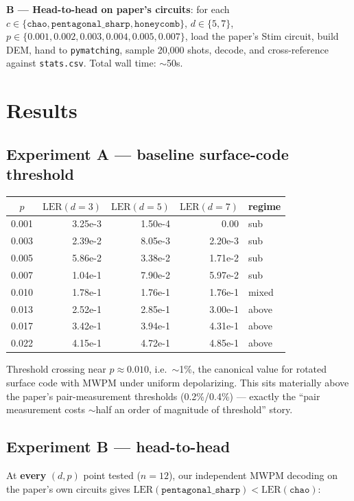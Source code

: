 \documentclass[11pt]{article}
\begin{document}
\textbf{B --- Head-to-head on paper's circuits}: for each
$c \in \{\texttt{chao}, \texttt{pentagonal\_sharp}, \texttt{honeycomb}\}$,
$d \in \{5,7\}$, $p \in \{0.001, 0.002, 0.003, 0.004, 0.005, 0.007\}$,
load the paper's Stim circuit, build DEM, hand to \texttt{pymatching},
sample 20{,}000 shots, decode, and cross-reference against
\texttt{stats.csv}. Total wall time: $\sim$50s.

\section{Results}

\subsection{Experiment A --- baseline surface-code threshold}

\begin{tabular}{crrrl}
\toprule
$p$ & $\text{LER}(d=3)$ & $\text{LER}(d=5)$ & $\text{LER}(d=7)$ & regime \\
\midrule
0.001 & 3.25e-3 & 1.50e-4 & 0.00    & sub   \\
0.003 & 2.39e-2 & 8.05e-3 & 2.20e-3 & sub   \\
0.005 & 5.86e-2 & 3.38e-2 & 1.71e-2 & sub   \\
0.007 & 1.04e-1 & 7.90e-2 & 5.97e-2 & sub   \\
0.010 & 1.78e-1 & 1.76e-1 & 1.76e-1 & mixed \\
0.013 & 2.52e-1 & 2.85e-1 & 3.00e-1 & above \\
0.017 & 3.42e-1 & 3.94e-1 & 4.31e-1 & above \\
0.022 & 4.15e-1 & 4.72e-1 & 4.85e-1 & above \\
\bottomrule
\end{tabular}

Threshold crossing near $p \approx 0.010$, i.e.\ $\sim$1\%, the canonical
value for rotated surface code with MWPM under uniform depolarizing. This
sits materially above the paper's pair-measurement thresholds
(0.2\%/0.4\%) --- exactly the ``pair measurement costs $\sim$half an order
of magnitude of threshold'' story.

\subsection{Experiment B --- head-to-head}

At \textbf{every} $(d,p)$ point tested ($n=12$), our independent MWPM decoding
on the paper's own circuits gives $\text{LER}(\texttt{pentagonal\_sharp}) <
\text{LER}(\texttt{chao})$:
\end{document}
